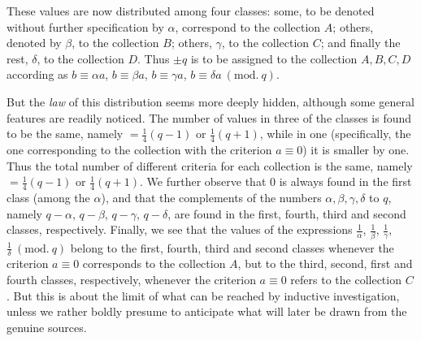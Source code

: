 These values are now distributed among four classes: some, to be denoted without further specification by $\alpha$, correspond to the collection $A$; others, denoted by $\beta$, to the collection $B$; others, $\gamma$, to the collection $C$; and finally the rest, $\delta$, to the collection $D$. Thus $\pm q$ is to be assigned to the collection $A,B,C,D$ according as $b\equiv\alpha a$, $b\equiv\beta a$, $b\equiv\gamma a$, $b\equiv\delta a\ (\mathrm{mod.}\ q)$.

But the \emph{law} of this distribution seems more deeply hidden, although some general features are readily noticed. The number of values in three of the classes is found to be the same, namely $=\frac14(q-1)$ or $\frac14(q+1)$, while in one (specifically, the one corresponding to the collection with the criterion $a\equiv0$) it is smaller by one. Thus the total number of different criteria for each collection is the same, namely $=\frac14(q-1)$ or $\frac14(q+1)$. We further observe that $0$ is always found in the first class (among the $\alpha$), and that the complements of the numbers $\alpha,\beta,\gamma,\delta$ to $q$, namely $q-\alpha$, $q-\beta$, $q-\gamma$, $q-\delta$, are found in the first, fourth, third and second classes, respectively. Finally, we see that the values of the expressions $\frac1\alpha$, $\frac1\beta$, $\frac1\gamma$, $\frac1\delta\ (\mathrm{mod.}\ q)$ belong to the first, fourth, third and second classes whenever the criterion $a\equiv0$ corresponds to the collection $A$, but to the third, second, first and fourth classes, respectively, whenever the criterion $a\equiv0$ refers to the collection $C$. But this is about the limit of what can be reached by inductive investigation, unless we rather boldly presume to anticipate what will later be drawn from the genuine sources.

